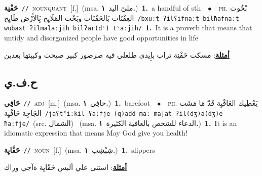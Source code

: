 \documentclass[10pt,a4paper,twoside]{article} %
\begin{document}
\begin{multicols}{2}
{\setlength\topsep{0pt}\textbf{\foreignlanguage{arabic}{حَفْنِة}}\ {\color{gray}\texttt{//}\color{black}}\ \textsc{noun\textunderscore quant}\ [f.]\ \color{gray}(msa. \foreignlanguage{arabic}{ملئ اليد}~\foreignlanguage{arabic}{\textbf{١.}})\color{black}\ \textbf{1.}~a handful of sth\ \ $\bullet$\ \ \textsc{ph.} \color{gray} \foreignlanguage{arabic}{بْخُوت العِفْنَات بَالحَفْنَات وبَخْت المَلَايِح بَِالأَرْض طَايِح}\color{black}\ {\color{gray}\texttt{/{\sffamily bxuːt ʔilʕifnaːt bilħafnaːt wubaxt ʔilmalaːjiħ bilʔar(dˤ) tˤaːjiħ}/}\color{black}}\ \textbf{1.}~It is a proverb that means that untidy and disorganized people have good opportunities in life\  \begin{flushright}\color{gray}\foreignlanguage{arabic}{\textbf{\underline{\foreignlanguage{arabic}{أمثلة}}}: مسكت حَفْنِة تراب بإِيدي طلعلي فيه صرصور كبير صيحت وكبيتها بعدين}\end{flushright}\color{black}} \vspace{2mm}

\vspace{-3mm}
\subsection*{\color{blue}\foreignlanguage{arabic}{ح.ف.ي}\color{blue}{}} 

{\setlength\topsep{0pt}\textbf{\foreignlanguage{arabic}{حَافِي}}\ {\color{gray}\texttt{//}\color{black}}\ \textsc{adj}\ [m.]\ \color{gray}(msa. \foreignlanguage{arabic}{حافِي}~\foreignlanguage{arabic}{\textbf{١.}})\color{black}\ \textbf{1.}~barefoot\ \ $\bullet$\ \ \textsc{ph.} \color{gray} \foreignlanguage{arabic}{يَعْطِيك العَافْيِة قَدّ مَا مَشَت الجَاجِة حَافْيِة}\color{black}\ {\color{gray}\texttt{/{\sffamily jaʕtˤiːkil ʕaːfje (q)add maː maʃat ʔil(dʒ)a(dʒ)e ħaːfje}/}\color{black}}\ \color{gray}(src. \foreignlanguage{arabic}{الشمال})\color{black}\ \color{gray} (msa. \foreignlanguage{arabic}{الدعاء للشخص بالعافية الكثيرة}~\foreignlanguage{arabic}{\textbf{١.}})\color{black}\ \textbf{1.}~It is an idiomatic expression that means May God give you health!\ } \vspace{2mm}

{\setlength\topsep{0pt}\textbf{\foreignlanguage{arabic}{حَفَّايِة}}\ {\color{gray}\texttt{//}\color{black}}\ \textsc{noun}\ [f.]\ \color{gray}(msa. \foreignlanguage{arabic}{شِبْشِب}~\foreignlanguage{arabic}{\textbf{١.}})\color{black}\ \textbf{1.}~slippers\  \begin{flushright}\color{gray}\foreignlanguage{arabic}{\textbf{\underline{\foreignlanguage{arabic}{أمثلة}}}: استنى علي ألبس حَفّايِة ةآجي وراك}\end{flushright}\color{black}} \vspace{2mm}


\end{multicols}
\end{document}
